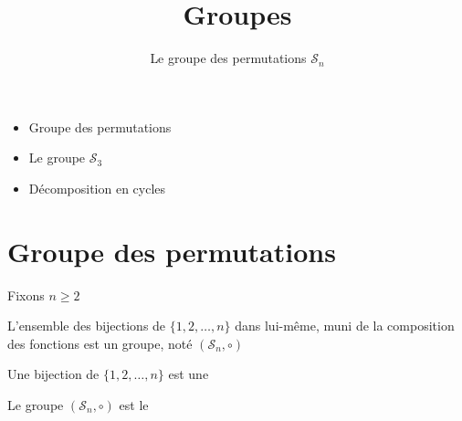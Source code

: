 










\title{{\bf Groupes}}
\subtitle{Le groupe des permutations $\mathcal{S}_n$}

\begin{frame}
  
  \debutmontitre

  \pause

{\footnotesize
\hfill
{}
\begin{minipage}{0.6\textwidth}
  \begin{itemize}
    \item<3-> Groupe des permutations
    \item<4-> Le groupe $\mathcal{S}_3$
    \item<5-> Décomposition en cycles
  \end{itemize}
\end{minipage}
}

\end{frame}

\setcounter{framenumber}{0}







\section{Groupe des permutations}


\begin{frame}

Fixons $n\ge 2$
\begin{proposition}
L'ensemble des bijections de $\{1,2,\ldots,n\}$ dans lui-même, muni de la composition
des fonctions est un groupe, noté $(\mathcal{S}_n,\circ)$
\end{proposition}

\pause
\bigskip

Une bijection de $\{1,2,\ldots,n\}$  est une 

Le groupe $(\mathcal{S}_n,\circ)$ est le  

\end{frame}


